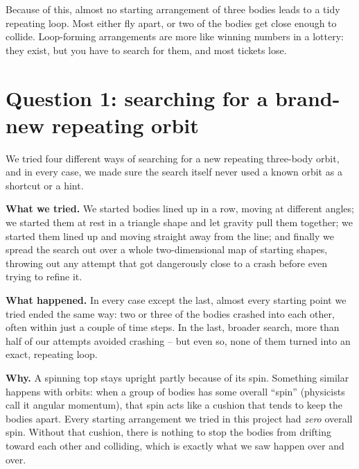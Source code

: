 \documentclass[11pt]{article}
\begin{document}
Because of this, almost no starting arrangement of three bodies leads to a
tidy repeating loop. Most either fly apart, or two of the bodies get close
enough to collide. Loop-forming arrangements are more like winning
numbers in a lottery: they exist, but you have to search for them, and
most tickets lose.

\section{Question 1: searching for a brand-new repeating orbit}

We tried four different ways of searching for a new repeating three-body
orbit, and in every case, we made sure the search itself never used a
known orbit as a shortcut or a hint.

\textbf{What we tried.} We started bodies lined up in a row, moving at
different angles; we started them at rest in a triangle shape and let
gravity pull them together; we started them lined up and moving straight
away from the line; and finally we spread the search out over a whole
two-dimensional map of starting shapes, throwing out any attempt that got
dangerously close to a crash before even trying to refine it.

\textbf{What happened.} In every case except the last, almost every
starting point we tried ended the same way: two or three of the bodies
crashed into each other, often within just a couple of time steps. In the
last, broader search, more than half of our attempts avoided crashing --
but even so, none of them turned into an exact, repeating loop.

\textbf{Why.} A spinning top stays upright partly because of its spin.
Something similar happens with orbits: when a group of bodies has some
overall ``spin'' (physicists call it angular momentum), that spin acts
like a cushion that tends to keep the bodies apart. Every starting
arrangement we tried in this project had \emph{zero} overall spin. Without
that cushion, there is nothing to stop the bodies from drifting toward
each other and colliding, which is exactly what we saw happen over and
over.
\end{document}
